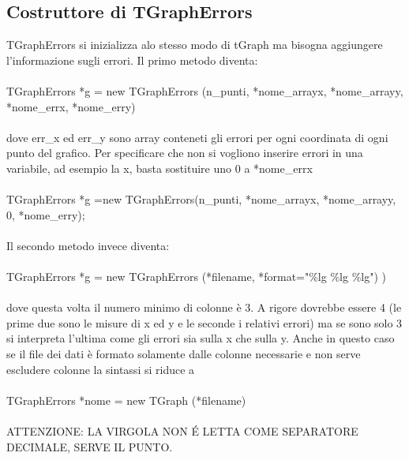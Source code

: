 \documentclass[10pt,a4paper]{article}
\begin{document}
\subsection{Costruttore di TGraphErrors}
TGraphErrors si inizializza alo stesso modo di tGraph ma bisogna aggiungere l'informazione sugli errori. Il primo metodo diventa:\\\\
TGraphErrors *g = new TGraphErrors (n\_punti, *nome\_arrayx, *nome\_arrayy, *nome\_errx, *nome\_erry)\\\\
dove err\_x ed err\_y sono array conteneti gli errori per ogni coordinata di ogni punto del grafico. Per specificare che non si vogliono inserire errori in una variabile, ad esempio la x, basta sostituire uno 0 a *nome\_errx\\\\
TGraphErrors *g =new TGraphErrors(n\_punti, *nome\_arrayx, *nome\_arrayy, 0, *nome\_erry);\\\\
Il secondo metodo invece diventa: \\\\
TGraphErrors *g = new TGraphErrors (*filename, *format="\%lg \%lg \%lg") )\\\\
dove questa volta il numero minimo di colonne è 3. A rigore dovrebbe essere 4 (le prime due sono le misure di x ed y e le seconde i relativi errori) ma se sono solo 3 si interpreta l'ultima come gli errori sia sulla x che sulla y. Anche in questo caso se il file dei dati è formato solamente dalle colonne necessarie e non serve escludere colonne la sintassi si riduce a\\\\
TGraphErrors *nome = new TGraph (*filename)\\\\
ATTENZIONE: LA VIRGOLA NON \'{E} LETTA COME SEPARATORE DECIMALE, SERVE IL PUNTO. 
\end{document}
